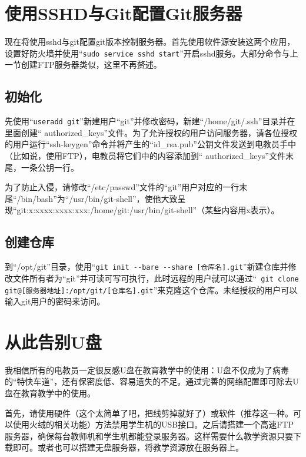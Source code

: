 \section{使用SSHD与Git配置Git服务器}
现在将使用sshd与git配置git版本控制服务器。首先使用软件源安装这两个应用，设置好防火墙并使用“\verb|sudo service sshd start|”开启sshd服务。大部分命令与上一节创建FTP服务器类似，这里不再赘述。
\subsection{初始化}
先使用“\verb|useradd git|”新建用户“git”并修改密码，新建“/home/git/.ssh”目录并在里面创建“ authorized\_keys”文件。为了允许授权的用户访问服务器，请各位授权的用户运行“ssh-keygen”命令并将产生的“id\_rsa.pub”公钥文件发送到电教员手中（比如说，使用FTP），电教员将它们中的内容添加到“ authorized\_keys”文件末尾，一条公钥一行。\par
为了防止入侵，请修改“/etc/passwd”文件的“git”用户对应的一行末尾“/bin/bash”为“/usr/bin/git-shell”，使他大致呈现“git:x:xxxx:xxxx:xxx:/home/git:/usr/bin/git-shell”（某些内容用x表示）。
\subsection{创建仓库}
到“/opt/git”目录，使用“\verb|git init --bare --share [仓库名].git|”新建仓库并修改文件所有者为“git”并可读可写可执行，此时远程的用户就可以通过“\verb| git clone git@[服务器地址]:/opt/git/[仓库名].git|”来克隆这个仓库。未经授权的用户可以输入git用户的密码来访问。
\section{从此告别U盘}
我相信所有的电教员一定很反感U盘在教育教学中的使用：U盘不仅成为了病毒的“特快车道”，还有保密度低、容易遗失的不足。通过完善的网络配置即可除去U盘在教育教学中的使用。\par
首先，请使用硬件（这个太简单了吧，把线剪掉就好了）或软件（推荐这一种。可以使用火绒的相关功能）方法禁用学生机的USB接口。之后请搭建一个高速FTP服务器，确保每台教师机和学生机都能登录服务器。这样需要什么教学资源只要下载即可。或者也可以搭建无盘服务器，将教学资源放在服务器上。
